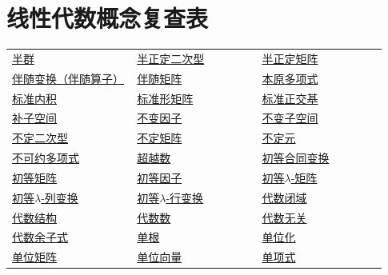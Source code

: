 \chapter*{线性代数概念复查表}
{}

\begingroup
\setlength{\tabcolsep}{5pt}
\renewcommand{\arraystretch}{1.25}
\begin{longtable}{@{}>{\raggedright\arraybackslash}p{0.31\linewidth}>{\raggedright\arraybackslash}p{0.31\linewidth}>{\raggedright\arraybackslash}p{0.31\linewidth}@{}}
\hline
\endfirsthead
\hline
\endhead
\hline
\endfoot
\hline
\endlastfoot
\hyperref[p1:concept:c1-l7]{半群} & \hyperref[p1:concept:c7-l1976]{半正定二次型} & \hyperref[p1:concept:c7-l1976]{半正定矩阵}\\
\hyperref[p1:concept:c6-l2084]{伴随变换（伴随算子）} & \hyperref[p1:concept:c3-l2481]{伴随矩阵} & \hyperref[p1:concept:c1-l1154]{本原多项式}\\
\hyperref[p1:concept:c6-l46]{标准内积} & \hyperref[p1:concept:c2-l894]{标准形矩阵} & \hyperref[p1:concept:c6-l399]{标准正交基}\\
\hyperref[p1:concept:c4-l1313]{补子空间} & \hyperref[p1:concept:c5-l2373]{不变因子} & \hyperref[p1:concept:c5-l8]{不变子空间}\\
\hyperref[p1:concept:c7-l1972]{不定二次型} & \hyperref[p1:concept:c7-l1972]{不定矩阵} & \hyperref[p1:concept:c1-l558]{不定元}\\
\hyperref[p1:concept:c1-l789]{不可约多项式} & \hyperref[p1:concept:c1-l991]{超越数} & \hyperref[p1:concept:c7-l795]{初等合同变换}\\
\hyperref[p1:concept:c3-l920]{初等矩阵} & \hyperref[p1:concept:c5-l2454]{初等因子} & \hyperref[p1:concept:c5-l2058]{初等$\lambda$-矩阵}\\
\hyperref[p1:concept:c5-l2058]{初等$\lambda$-列变换} & \hyperref[p1:concept:c5-l2058]{初等$\lambda$-行变换} & \hyperref[p1:concept:c1-l1081]{代数闭域}\\
\hyperref[p1:concept:c1-l7]{代数结构} & \hyperref[p1:concept:c1-l991]{代数数} & \hyperref[p1:concept:c1-l1278]{代数无关}\\
\hyperref[p1:concept:c3-l2331]{代数余子式} & \hyperref[p1:concept:c1-l1024]{单根} & \hyperref[p1:concept:c6-l101]{单位化}\\
\hyperref[p1:concept:c3-l717]{单位矩阵} & \hyperref[p1:concept:c6-l101]{单位向量} & \hyperref[p1:concept:c1-l1278]{单项式}\\

\end{longtable}

